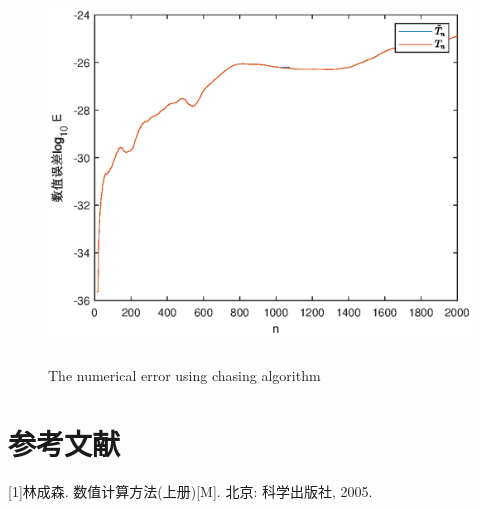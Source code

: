 \documentclass[UTF8,a4paper,10pt]{ctexart}
\begin{document}
\begin{figure}[ht]
    \centering
    \includegraphics[width=14cm,height=10cm]{1.4_numerical_error.eps}
    \caption{The numerical error using chasing algorithm}
\end{figure}

\section*{参考文献}
[1]林成森. 数值计算方法(上册)[M]. 北京: 科学出版社, 2005.
\end{document}
